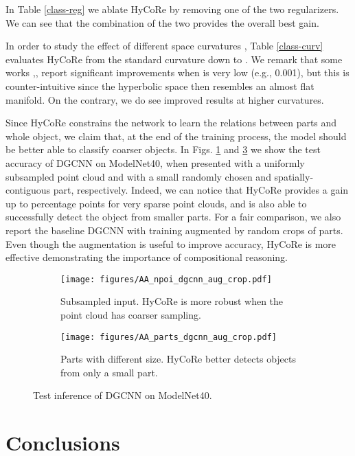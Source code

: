 \documentclass{article}
\begin{document}
In Table \ref{class-reg} we ablate HyCoRe by removing one of the two regularizers. We can see that the combination of the two provides the overall best gain.  

In order to study the effect of different space curvatures , Table \ref{class-curv} evaluates HyCoRe from the standard curvature  down to . We remark that some works \cite{khrulkov2020hyperbolic},\cite{ermolov2022hyperbolic}, report significant improvements when  is very low (e.g., 0.001), but this is counter-intuitive since the hyperbolic space then resembles an almost flat manifold. On the contrary, we do see improved results at higher curvatures.

Since HyCoRe constrains the network to learn the relations between parts and whole object, we claim that, at the end of the training process, the model should be better able to classify coarser objects. 
In Figs. \ref{fig:oapoints} and \ref{fig:oapointsparts} we show the test accuracy of DGCNN on ModelNet40, when presented with a uniformly subsampled point cloud and with a small randomly chosen and spatially-contiguous part, respectively. Indeed, we can notice that HyCoRe provides a gain up to  percentage points for very sparse point clouds, and is also able to successfully detect the object from smaller parts. For a fair comparison, we also report the baseline DGCNN with training augmented by random crops of parts. Even though the augmentation is useful to improve accuracy, HyCoRe is more effective demonstrating the importance of compositional reasoning.


\begin{figure}
\centering
\begin{subfigure}{0.47\textwidth}
\centering
    \texttt{[image: figures/AA\_npoi\_dgcnn\_aug\_crop.pdf]}
    \caption{Subsampled input. HyCoRe is more robust when the point cloud has coarser sampling.}
    \label{fig:oapoints}
\end{subfigure}
\quad
\begin{subfigure}{0.47\textwidth}
    \texttt{[image: figures/AA\_parts\_dgcnn\_aug\_crop.pdf]}
    \caption{Parts with different size. HyCoRe better detects objects from only a small part.}
    \label{fig:oapointsparts}
\end{subfigure}
\caption{Test inference of DGCNN on ModelNet40.}
\end{figure}





\section{Conclusions}
\end{document}

